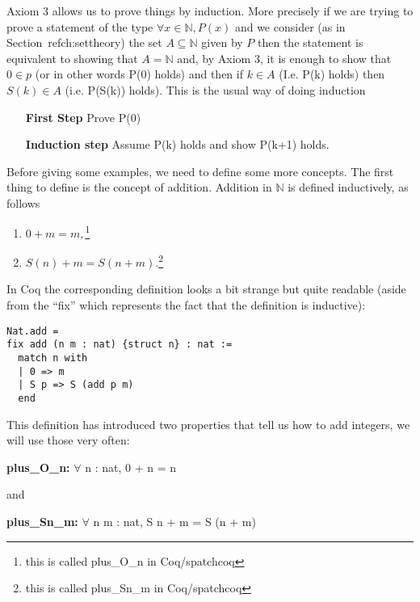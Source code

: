 Axiom 3 allows us to prove things by induction. More precisely if we are trying to prove a statement of the type $\forall x \in \mathbb{N}, P(x)$ and we consider (as in Section\ ref{ch:settheory}) the set $A\subseteq \mathbb{N}$ given by $P$ then the statement is equivalent to showing that $A=\mathbb{N}$ and, by Axiom 3, it is enough to show that $0\in p$ (or in other words P(0) holds) and then if $k \in A$ (I.e. P(k) holds) then $S(k) \in A$ (i.e. P(S(k)) holds). This is the usual way of doing induction

\begin{enumerate}
\item[\bf First Step] Prove P(0)
\item[\bf Induction step] Assume P(k) holds and show P(k+1) holds.
\end{enumerate}

Before giving some examples, we need to define some more concepts. The first thing to define is the concept of addition. Addition in $\mathbb{N}$ is defined inductively, as follows  
\begin{enumerate}
\item $0+m=m,$\footnote{this is called plus\_O\_n in Coq/spatchcoq}
\item $S(n) +m = S(n+m)$.\footnote{this is called plus\_Sn\_m in Coq/spatchcoq}
\end{enumerate}

In Coq the corresponding definition looks a bit strange but quite readable (aside from the ``fix''  which represents the fact that the definition is inductive):

\begin{verbatim}
Nat.add = 
fix add (n m : nat) {struct n} : nat :=
  match n with
  | 0 => m
  | S p => S (add p m)
  end
  \end{verbatim}

This definition has introduced two properties that  tell us how to add integers, we will use those very often:

{\bf plus\_O\_n:} $\forall$ n : nat, 0 + n = n


and

{\bf plus\_Sn\_m:} $\forall$ n m : nat, S n + m = S (n + m)

